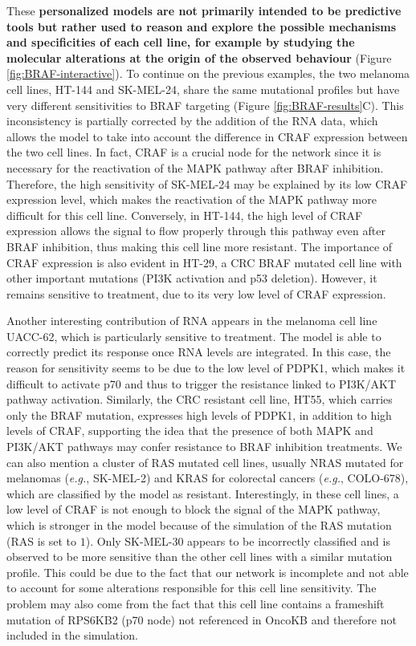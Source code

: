 \documentclass[a4paper,12pt,twoside,onecolumn,openright,final,oldfontcommands]{memoir}
\begin{document}
These \textbf{personalized models are not primarily intended to be
predictive tools but rather used to reason and explore the possible
mechanisms and specificities of each cell line, for example by studying
the molecular alterations at the origin of the observed behaviour}
(Figure \ref{fig:BRAF-interactive}). To continue on the previous
examples, the two melanoma cell lines, HT-144 and SK-MEL-24, share the
same mutational profiles but have very different sensitivities to BRAF
targeting (Figure \ref{fig:BRAF-results}C). This inconsistency is
partially corrected by the addition of the RNA data, which allows the
model to take into account the difference in CRAF expression between the
two cell lines. In fact, CRAF is a crucial node for the network since it
is necessary for the reactivation of the MAPK pathway after BRAF
inhibition. Therefore, the high sensitivity of SK-MEL-24 may be
explained by its low CRAF expression level, which makes the reactivation
of the MAPK pathway more difficult for this cell line. Conversely, in
HT-144, the high level of CRAF expression allows the signal to flow
properly through this pathway even after BRAF inhibition, thus making
this cell line more resistant. The importance of CRAF expression is also
evident in HT-29, a CRC BRAF mutated cell line with other important
mutations (PI3K activation and p53 deletion). However, it remains
sensitive to treatment, due to its very low level of CRAF expression.

Another interesting contribution of RNA appears in the melanoma cell
line UACC-62, which is particularly sensitive to treatment. The model is
able to correctly predict its response once RNA levels are integrated.
In this case, the reason for sensitivity seems to be due to the low
level of PDPK1, which makes it difficult to activate p70 and thus to
trigger the resistance linked to PI3K/AKT pathway activation. Similarly,
the CRC resistant cell line, HT55, which carries only the BRAF mutation,
expresses high levels of PDPK1, in addition to high levels of CRAF,
supporting the idea that the presence of both MAPK and PI3K/AKT pathways
may confer resistance to BRAF inhibition treatments. We can also mention
a cluster of RAS mutated cell lines, usually NRAS mutated for melanomas
(\emph{e.g.}, SK-MEL-2) and KRAS for colorectal cancers (\emph{e.g.},
COLO-678), which are classified by the model as resistant.
Interestingly, in these cell lines, a low level of CRAF is not enough to
block the signal of the MAPK pathway, which is stronger in the model
because of the simulation of the RAS mutation (RAS is set to \(1\)).
Only SK-MEL-30 appears to be incorrectly classified and is observed to
be more sensitive than the other cell lines with a similar mutation
profile. This could be due to the fact that our network is incomplete
and not able to account for some alterations responsible for this cell
line sensitivity. The problem may also come from the fact that this cell
line contains a frameshift mutation of RPS6KB2 (p70 node) not referenced
in OncoKB and therefore not included in the simulation.
\end{document}
